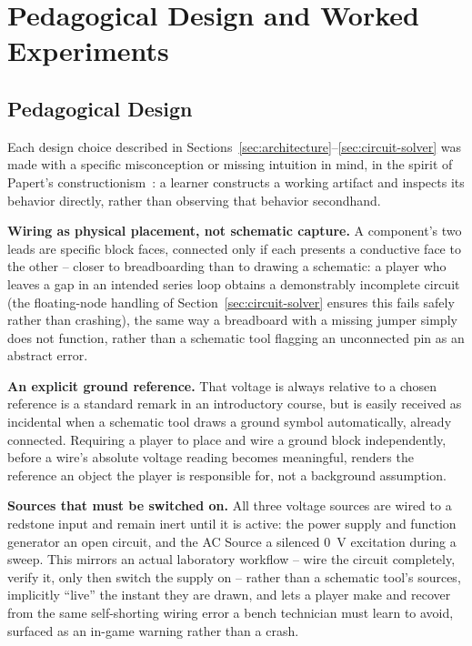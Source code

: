 \section{Pedagogical Design and Worked Experiments}

\subsection{Pedagogical Design}
\label{sec:pedagogy}

Each design choice described in Sections~\ref{sec:architecture}--\ref{sec:circuit-solver}
was made with a specific misconception or missing intuition in mind, in the spirit of
Papert's constructionism~\cite{papert1980mindstorms}: a learner constructs a working artifact
and inspects its behavior directly, rather than observing that behavior secondhand.

\textbf{Wiring as physical placement, not schematic capture.} A component's two leads are
specific block faces, connected only if each presents a conductive face to the other -- closer
to breadboarding than to drawing a schematic: a player who leaves a gap in an intended series
loop obtains a demonstrably incomplete circuit (the floating-node handling of
Section~\ref{sec:circuit-solver} ensures this fails safely rather than crashing), the same way
a breadboard with a missing jumper simply does not function, rather than a schematic tool
flagging an unconnected pin as an abstract error.

\textbf{An explicit ground reference.} That voltage is always relative to a chosen reference
is a standard remark in an introductory course, but is easily received as incidental when a
schematic tool draws a ground symbol automatically, already connected. Requiring a player to
place and wire a ground block independently, before a wire's absolute voltage reading becomes
meaningful, renders the reference an object the player is responsible for, not a background
assumption.

\textbf{Sources that must be switched on.} All three voltage sources are wired to a redstone
input and remain inert until it is active: the power supply and function generator an open
circuit, and the AC Source a silenced 0~V excitation during a sweep. This mirrors an actual
laboratory workflow -- wire the circuit completely, verify it, only then switch the supply
on -- rather than a schematic tool's sources, implicitly ``live'' the instant they are drawn,
and lets a player make and recover from the same self-shorting wiring error a bench
technician must learn to avoid, surfaced as an in-game warning rather than a crash.

